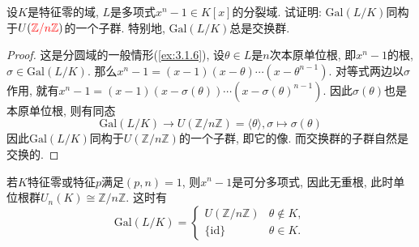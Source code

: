 \begin{problem}\label{ex:4.3.3}
    设$K$是特征零的域, $L$是多项式$x^n - 1 \in K[x]$的分裂域. 试证明: $\mathrm{Gal}(L/K)$同构于$U(\textcolor{red}{\mathbb{Z}/n\mathbb{Z}})$的一个子群. 特别地, $\mathrm{Gal}(L/K)$总是交换群.
\end{problem}

\begin{proof}
    这是分圆域的一般情形(\ref{ex:3.1.6}), 设$\theta \in L$是$n$次本原单位根, 即$x^n - 1$的根, $\sigma \in \mathrm{Gal}(L/K)$. 那么$x^n - 1 = (x - 1)(x - \theta) \cdots (x - \theta^{n - 1})$. 对等式两边以$\sigma$作用, 就有$x^n - 1 = (x - 1)(x - \sigma(\theta)) \cdots (x - \sigma(\theta)^{n - 1})$. 因此$\sigma(\theta)$也是本原单位根, 则有同态
    \[
        \mathrm{Gal}(L/K) \to U(\mathbb{Z}/n\mathbb{Z}) = \langle \theta \rangle, \sigma \mapsto \sigma(\theta)
    \]
    因此$\mathrm{Gal}(L/K)$同构于$U(\mathbb{Z}/n\mathbb{Z})$的一个子群, 即它的像. 而交换群的子群自然是交换的.
\end{proof}

\begin{remark}
    若$K$特征零或特征$p$满足$(p, n) = 1$, 则$x^n - 1$是可分多项式, 因此无重根, 此时单位根群$U_n(K) \cong \mathbb{Z}/n\mathbb{Z}$. 这时有
    \[
        \mathrm{Gal}(L/K) =
        \begin{cases}
            U(\mathbb{Z}/n\mathbb{Z}) & \theta \notin K,\\
            \{\mathrm{id}\} & \theta \in K.
        \end{cases} 
    \]
\end{remark}